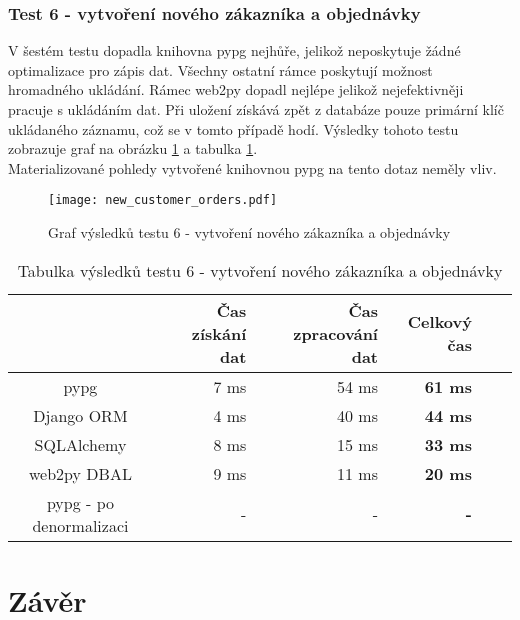 \documentclass[ing,male,java,dept456]{diploma}						%
\begin{document}
\subsubsection{Test 6 - vytvoření nového zákazníka a objednávky}
V šestém testu dopadla knihovna pypg nejhůře, jelikož neposkytuje žádné optimalizace pro zápis dat. Všechny ostatní rámce poskytují možnost hromadného ukládání. Rámec web2py dopadl nejlépe jelikož nejefektivněji pracuje s ukládáním dat. Při uložení získává zpět z databáze pouze primární klíč ukládaného záznamu, což se v tomto případě hodí. Výsledky tohoto testu zobrazuje graf na obrázku \ref{fig:TestNCO} a tabulka \ref{tab:TestNCO}.\\
Materializované pohledy vytvořené knihovnou pypg na tento dotaz neměly vliv. \\

\begin{figure}[h!]
    \centering
    \texttt{[image: new\_customer\_orders.pdf]}
    \caption{Graf výsledků testu 6 - vytvoření nového zákazníka a objednávky}
    \label{fig:TestNCO}
\end{figure}
\begin{table}[h!]
  \centering
  \begin{tabular}{|c|r|r|r|r|r|}
    \hline
    & Čas získání dat & Čas zpracování dat & \textbf{Celkový čas} \\
    \hline
    pypg & 7 ms & 54 ms & \textbf{61 ms} \\
    \hline
    Django ORM & 4 ms & 40 ms & \textbf{44 ms} \\
    \hline
    SQLAlchemy & 8 ms & 15 ms & \textbf{33 ms} \\
    \hline
    web2py DBAL & 9 ms & 11 ms & \textbf{20 ms} \\
    \hline
    pypg - po denormalizaci & - & - & \textbf{-} \\
    \hline
  \end{tabular}
  \caption{Tabulka výsledků testu 6 - vytvoření nového zákazníka a objednávky}
  \label{tab:TestNCO}
\end{table}

\section{Závěr}
\label{sec:Conclusion}

\end{document}
